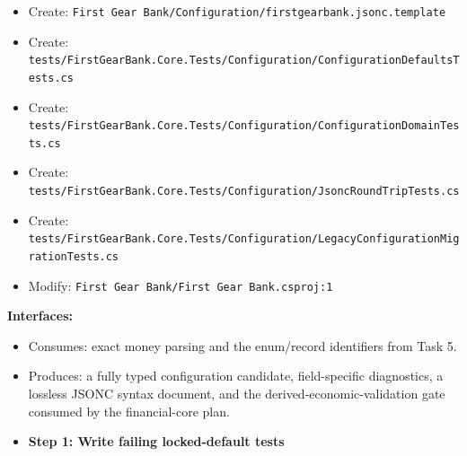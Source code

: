 \documentclass[
  10pt,
  letterpaper,
]{article}
\providecommand{\tightlist}{%
  \setlength{\itemsep}{0pt}\setlength{\parskip}{0pt}}
\begin{document}
\begin{itemize}
\item
  Create:
  \texttt{First\ }\allowbreak{}\texttt{Gear\ }\allowbreak{}\texttt{Bank/}\allowbreak{}\texttt{Configuration/}\allowbreak{}\texttt{firstgearbank.}\allowbreak{}\texttt{jsonc.}\allowbreak{}\texttt{template}
\item
  Create:
  \texttt{tests/}\allowbreak{}\texttt{FirstGearBank.}\allowbreak{}\texttt{Core.}\allowbreak{}\texttt{Tests/}\allowbreak{}\texttt{Configuration/}\allowbreak{}\texttt{ConfigurationDefaultsTests.}\allowbreak{}\texttt{cs}
\item
  Create:
  \texttt{tests/}\allowbreak{}\texttt{FirstGearBank.}\allowbreak{}\texttt{Core.}\allowbreak{}\texttt{Tests/}\allowbreak{}\texttt{Configuration/}\allowbreak{}\texttt{ConfigurationDomainTests.}\allowbreak{}\texttt{cs}
\item
  Create:
  \texttt{tests/}\allowbreak{}\texttt{FirstGearBank.}\allowbreak{}\texttt{Core.}\allowbreak{}\texttt{Tests/}\allowbreak{}\texttt{Configuration/}\allowbreak{}\texttt{JsoncRoundTripTests.}\allowbreak{}\texttt{cs}
\item
  Create:
  \texttt{tests/}\allowbreak{}\texttt{FirstGearBank.}\allowbreak{}\texttt{Core.}\allowbreak{}\texttt{Tests/}\allowbreak{}\texttt{Configuration/}\allowbreak{}\texttt{LegacyConfigurationMigrationTests.}\allowbreak{}\texttt{cs}
\item
  Modify:
  \texttt{First\ }\allowbreak{}\texttt{Gear\ }\allowbreak{}\texttt{Bank/}\allowbreak{}\texttt{First\ }\allowbreak{}\texttt{Gear\ }\allowbreak{}\texttt{Bank.}\allowbreak{}\texttt{csproj:}\allowbreak{}\texttt{1}
\end{itemize}

\textbf{Interfaces:}

\begin{itemize}
\tightlist
\item
  Consumes: exact money parsing and the enum/record identifiers from
  Task 5.
\item
  Produces: a fully typed configuration candidate, field-specific
  diagnostics, a lossless JSONC syntax document, and the
  derived-economic-validation gate consumed by the financial-core plan.
\end{itemize}

\begin{itemize}
\tightlist
\item[$\square$]
  \textbf{Step 1: Write failing locked-default tests}
\end{itemize}
\end{document}
